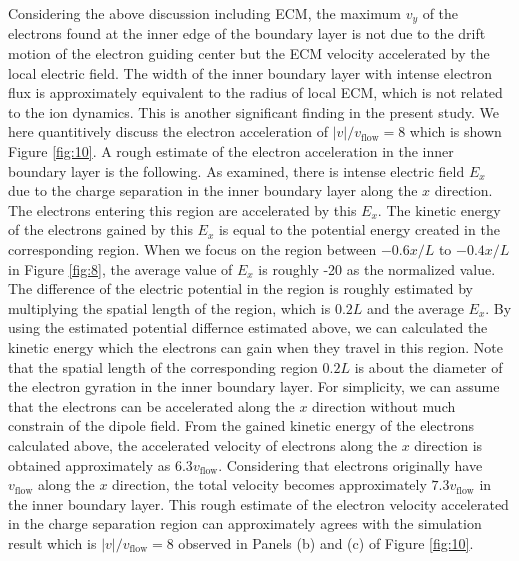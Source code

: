 \documentclass[draft,jgrga]{agutex2015}
\begin{document}
\begin{article}

%
%

Considering the above discussion including ECM, 
the maximum $v_y$ of the electrons found at the inner edge of the 
boundary layer is not due to the drift motion of the electron guiding center
but the ECM velocity accelerated by the local electric field. 
The width of the inner boundary layer with intense electron flux 
is approximately equivalent to the radius of local ECM, 
which is not related to the ion dynamics.
This is another significant finding in the present study.
%
%
We here quantitively discuss the electron acceleration of $|v|/v_\mathrm{flow}=8$ which
is shown Figure \ref{fig:10}. 
A rough estimate of the electron acceleration in the inner boundary layer is the following.
As examined, there is intense electric field $E_x$ due to the charge separation 
in the inner boundary layer along the $x$ direction.
The electrons entering this region are accelerated by this $E_x$.
The kinetic energy of the electrons gained by this $E_x$ is equal to 
the potential energy created in the corresponding region.
When we focus on the region between $-0.6x/L$ to $-0.4x/L$ in Figure \ref{fig:8}, 
the average value of $E_x$ is roughly -20 as the normalized value.
The difference of the electric potential in the region is 
roughly estimated by multiplying the spatial length of the region, which is $0.2L$ and the average $E_x$.
By using the estimated potential differnce estimated above, 
we can calculated the kinetic energy which the electrons can gain when they travel in this region. 
Note that 
the spatial length of the corresponding region $0.2L$ is about the diameter of 
the electron gyration in the inner boundary layer. 
For simplicity, we can assume that the electrons can be accelerated along the $x$ direction 
without much constrain of the dipole field.
From the gained kinetic energy of the electrons calculated above, 
the accelerated velocity of electrons along the $x$ direction is 
obtained approximately as $6.3v_\mathrm{flow}$. 
Considering that electrons originally have
$v_\mathrm{flow}$ along the $x$ direction,
the total velocity becomes approximately $7.3v_\mathrm{flow}$ in the inner boundary layer. 
This rough estimate of the electron velocity accelerated in the charge separation region can 
approximately agrees with the simulation result which is 
$|v|/v_\mathrm{flow}=8$ observed in Panels (b) and (c) of Figure \ref{fig:10}. 


\end{article}
\end{document}
